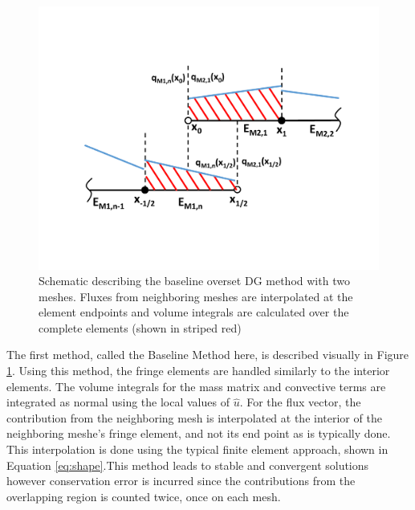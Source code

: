 \documentclass[11pt]{article}
\begin{document}
\begin{figure}[t]
\centering
  \includegraphics[width=\textwidth,trim={0 4cm 0 4cm},clip]{Figures/DGBaseOverset.pdf}
  \caption{Schematic describing the baseline overset DG method with two meshes. Fluxes from neighboring meshes are interpolated at the element endpoints and volume integrals are calculated over the complete elements (shown in striped red)}
  \label{fig:base}
\end{figure}

The first method, called the Baseline Method here, is described visually in Figure \ref{fig:base}. 
Using this method, the fringe elements are handled similarly to the interior elements. The volume
integrals for the mass matrix and convective terms are integrated as normal using the local values 
of $\hat{u}$. For the flux vector, the contribution from the neighboring mesh is interpolated
at the interior of the neighboring meshe's fringe element, and not its end point as is typically done. 
This interpolation is done using the typical finite element approach, shown in Equation 
\eqref{eq:shape}.This method leads to stable and convergent solutions
however conservation error is incurred since the contributions from the overlapping region is counted
twice, once on each mesh.
\end{document}
